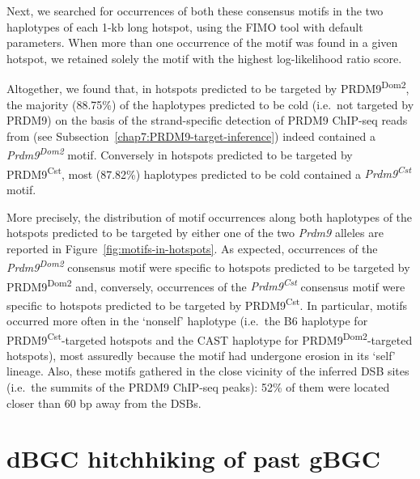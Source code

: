 Next, we searched for occurrences of both these consensus motifs in the two haplotypes of each 1-kb long hotspot, using the FIMO tool \citep{grant2011fimo} with default parameters. 
When more than one occurrence of the motif was found in a given hotspot, we retained solely the motif with the highest log-likelihood ratio score.

Altogether, we found that, in hotspots predicted to be targeted by PRDM9\textsuperscript{Dom2}, the majority (88.75\%) of the haplotypes predicted to be cold (i.e.\ not targeted by PRDM9) on the basis of the strand-specific detection of PRDM9 ChIP-seq reads from \citet{baker2015prdm9} (see Subsection~\ref{chap7:PRDM9-target-inference}) indeed contained a \textit{Prdm9\textsuperscript{Dom2}} motif. 
Conversely in hotspots predicted to be targeted by PRDM9\textsuperscript{Cst}, most (87.82\%) haplotypes predicted to be cold contained a \textit{Prdm9\textsuperscript{Cst}} motif.

More precisely, the distribution of motif occurrences along both haplotypes of the hotspots predicted to be targeted by either one of the two \textit{Prdm9} alleles are reported in Figure~\ref{fig:motifs-in-hotspots}.
As expected, occurrences of the \textit{Prdm9\textsuperscript{Dom2}} consensus motif were specific to hotspots predicted to be targeted by PRDM9\textsuperscript{Dom2} and, conversely, occurrences of the \textit{Prdm9\textsuperscript{Cst}} consensus motif were specific to hotspots predicted to be targeted by PRDM9\textsuperscript{Cst}.
In particular, motifs occurred more often in the ‘nonself’ haplotype (i.e.\ the B6 haplotype for PRDM9\textsuperscript{Cst}-targeted hotspots and the CAST haplotype for PRDM9\textsuperscript{Dom2}-targeted hotspots), most assuredly because the motif had undergone erosion in its ‘self’ lineage.
Also, these motifs gathered in the close vicinity of the inferred DSB sites (i.e.\ the summits of the PRDM9 ChIP-seq peaks): 52\% of them were located closer than 60 bp away from the DSBs.





\section{dBGC hitchhiking of past gBGC}


